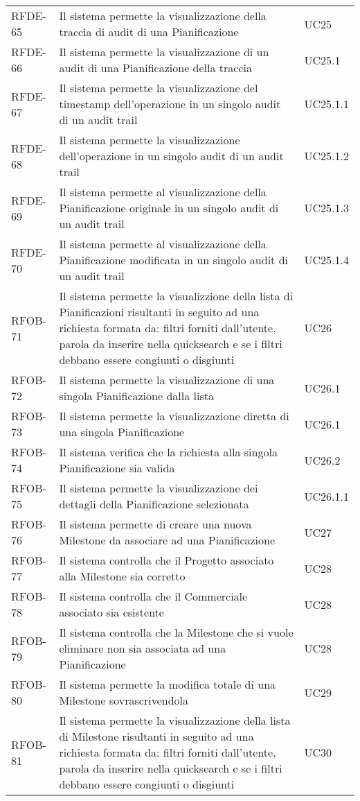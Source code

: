\begin{center}
\begin{longtable}{p{2.0cm}|p{8cm}|p{2.7cm}}
RFDE-65 & Il sistema permette la visualizzazione della traccia di audit di una Pianificazione & UC25\\
RFDE-66 & Il sistema permette la visualizzazione di un audit di una Pianificazione della traccia & UC25.1\\
RFDE-67 & Il sistema permette la visualizzazione del timestamp dell'operazione in un singolo audit di un audit trail & UC25.1.1\\
RFDE-68 & Il sistema permette la visualizzazione dell'operazione in un singolo audit di un audit trail & UC25.1.2\\
RFDE-69 & Il sistema permette al visualizzazione della Pianificazione originale in un singolo audit di un audit trail & UC25.1.3\\
RFDE-70 & Il sistema permette al visualizzazione della Pianificazione modificata in un singolo audit di un audit trail & UC25.1.4\\
RFOB-71 & Il sistema permette la visualizzione della lista di Pianificazioni risultanti in seguito ad una richiesta formata da: filtri forniti dall'utente, parola da inserire nella quicksearch e se i filtri debbano essere congiunti o disgiunti & UC26\\
RFOB-72 & Il sistema permette la visualizzazione di una singola Pianificazione dalla lista & UC26.1\\
RFOB-73 & Il sistema permette la visualizzazione diretta di una singola Pianificazione & UC26.1\\
RFOB-74 & Il sistema verifica che la richiesta alla singola Pianificazione sia valida & UC26.2\\
RFOB-75 & Il sistema permette la visualizzazione dei dettagli della Pianificazione selezionata & UC26.1.1\\
RFOB-76 & Il sistema permette di creare una nuova Milestone da associare ad una Pianificazione & UC27\\
RFOB-77 & Il sistema controlla che il Progetto associato alla Milestone sia corretto & UC28\\
RFOB-78 & Il sistema controlla che il Commerciale associato sia esistente & UC28\\
RFOB-79 & Il sistema controlla che la Milestone che si vuole eliminare non sia associata ad una Pianificazione & UC28\\
RFOB-80 & Il sistema permette la modifica totale di una Milestone sovrascrivendola & UC29\\
RFOB-81 & Il sistema permette la visualizzazione della lista di Milestone risultanti in seguito ad una richiesta formata da: filtri forniti dall'utente, parola da inserire nella quicksearch e se i filtri debbano essere congiunti o disgiunti & UC30\\

\end{longtable}
\end{center}
